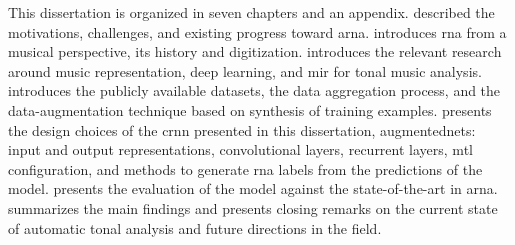 
This dissertation is organized in seven chapters and an
appendix.  described the motivations,
challenges, and existing progress toward \gls{arna}.
 introduces
\gls{rna} from a musical perspective, its history and
digitization.  introduces the relevant
research around music representation, deep learning, and
\gls{mir} for tonal music analysis.
 introduces the
publicly available datasets, the data aggregation process,
and the data-augmentation technique based on synthesis of
training examples.  presents the design
choices of the \gls{crnn} presented in this dissertation,
\gls{augmentednets}: input and output representations,
convolutional layers, recurrent layers, \gls{mtl}
configuration, and methods to generate \gls{rna} labels from
the predictions of the model.
 presents the evaluation of
the model against the state-of-the-art in \gls{arna}.
 summarizes the main findings and
presents closing remarks on the current state of automatic
tonal analysis and future directions in the field.
